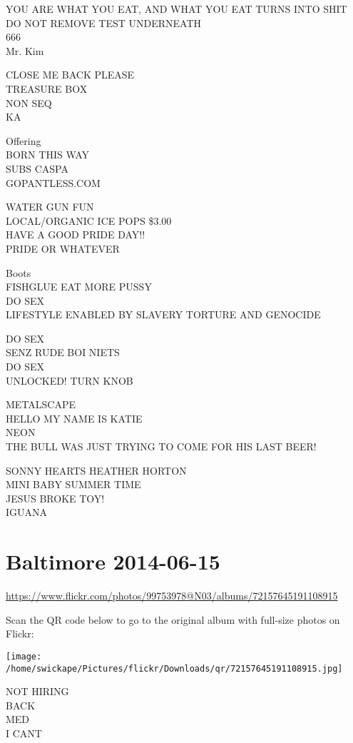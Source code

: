 \documentclass[10pt,letterpaper]{article}
\begin{document}
YOU ARE WHAT YOU EAT, AND WHAT YOU EAT TURNS INTO SHIT\\
DO NOT REMOVE TEST UNDERNEATH\\
666\\
Mr. Kim

CLOSE ME BACK PLEASE\\
TREASURE BOX\\
NON SEQ\\
KA

Offering\\
BORN THIS WAY\\
SUBS CASPA\\
GOPANTLESS.COM

WATER GUN FUN\\
LOCAL/ORGANIC ICE POPS \$3.00\\
HAVE A GOOD PRIDE DAY!!\\
PRIDE OR WHATEVER

Boots\\
FISHGLUE EAT MORE PUSSY\\
DO SEX\\
LIFESTYLE ENABLED BY SLAVERY TORTURE AND GENOCIDE

DO SEX\\
SENZ RUDE BOI NIETS\\
DO SEX\\
UNLOCKED!  TURN KNOB

METALSCAPE\\
HELLO MY NAME IS KATIE\\
NEON\\
THE BULL WAS JUST TRYING TO COME FOR HIS LAST BEER!

SONNY HEARTS HEATHER HORTON\\
MINI BABY SUMMER TIME\\
JESUS BROKE TOY!\\
IGUANA


\section*{Baltimore 2014-06-15}

\url{https://www.flickr.com/photos/99753978@N03/albums/72157645191108915}

Scan the QR code below to go to the original album with full-size photos on Flickr:

\texttt{[image: /home/swickape/Pictures/flickr/Downloads/qr/72157645191108915.jpg]}


NOT HIRING\\
BACK\\
MED\\
I CANT
\end{document}
